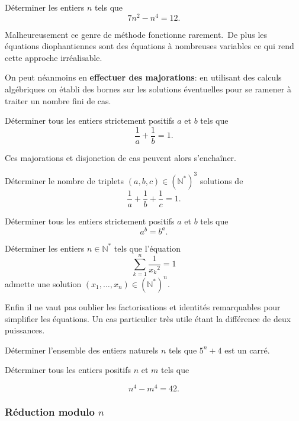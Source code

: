 \begin{exo}
  Déterminer les entiers $n$ tels que
  \[7 n^2 - n^4 = 12. \]
\end{exo}


Malheureusement ce genre de méthode fonctionne rarement. De plus les équations diophantiennes sont des équations à nombreuses variables ce qui rend cette approche irréalisable.

On peut néanmoins en \textbf{effectuer des majorations}: en utilisant des calculs algébriques on établi des bornes sur les solutions éventuelles pour se ramener à traiter un nombre fini de cas.


\begin{exo}
  Déterminer tous les entiers strictement positifs $a$ et $b$ tels que
  \[\frac{1}{a} + \frac{1}{b} = 1.\]
\end{exo}


Ces majorations et disjonction de cas peuvent alors s'enchaîner.
\begin{exo}
  Déterminer le nombre de triplets $(a,b,c) \in \left(\mathbb{N}^* \right)^3$ solutions de
  \[\frac{1}{a} + \frac{1}{b} + \frac{1}{c} = 1.\]
\end{exo}

\begin{exo}
  Déterminer tous les entiers strictement positifs $a$ et $b$ tels que
  \[a^b = b^a.\]
\end{exo}

\begin{exo}[CG 90]
  Déterminer les entiers $n \in \mathbb{N}^*$ tels que l'équation
  \[ \sum_{k=1}^n \frac{1}{{x_k}^2}= 1\]
  admette une solution $(x_1,\ldots,x_n) \in (\mathbb{N}^*)^n$.
\end{exo}

Enfin il ne vaut pas oublier les factorisations et identités remarquables pour simplifier les équations. Un cas particulier très utile étant la différence de deux puissances.

\begin{exo}
  Déterminer l'ensemble des entiers naturels $n$ tels que $5^n + 4$ est un carré.
\end{exo}

\begin{exo}
  Déterminer tous les entiers positifs $n$ et $m$ tels que

  \[n^4-m^4 = 42.\]
\end{exo}

\subsubsection{Réduction modulo $n$}

